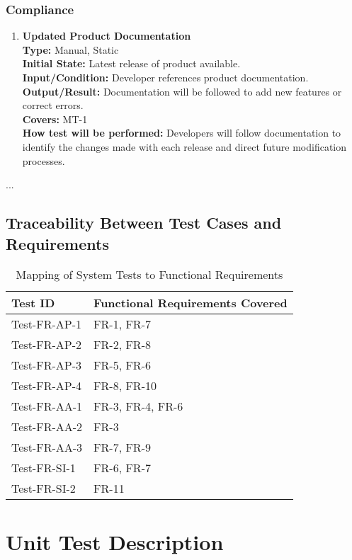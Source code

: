 \documentclass[12pt, titlepage]{article}
\begin{document}
\subsubsection{Compliance}
\begin{enumerate}[label=\bfseries ST-\arabic*:, wide=0pt]
  \item \label{test-ST1} \textbf{Updated Product Documentation}\\[2mm]
    {\bf Type:} Manual, Static\\
    {\bf Initial State:} Latest release of product available.\\
    {\bf Input/Condition:} Developer references product documentation.\\
    {\bf Output/Result:} Documentation will be followed to add new features or correct errors.\\
    {\bf Covers:} MT-1\\
    {\bf How test will be performed:} Developers will follow documentation to identify the changes made with each release and direct future modification processes.
\end{enumerate}


...

\subsection{Traceability Between Test Cases and Requirements}

\begin{table}[H]
\centering
\begin{tabular}{|l|l|}
\hline
\textbf{Test ID} & \textbf{Functional Requirements Covered} \\
\hline
Test-FR-AP-1 & FR-1, FR-7 \\
Test-FR-AP-2 & FR-2, FR-8 \\
Test-FR-AP-3 & FR-5, FR-6 \\
Test-FR-AP-4 & FR-8, FR-10 \\
Test-FR-AA-1 & FR-3, FR-4, FR-6 \\
Test-FR-AA-2 & FR-3\\
Test-FR-AA-3 & FR-7, FR-9\\
Test-FR-SI-1 & FR-6, FR-7 \\
Test-FR-SI-2 & FR-11 \\
\hline
\end{tabular}
\caption{Mapping of System Tests to Functional Requirements}
\end{table}

\section{Unit Test Description}
\end{document}
